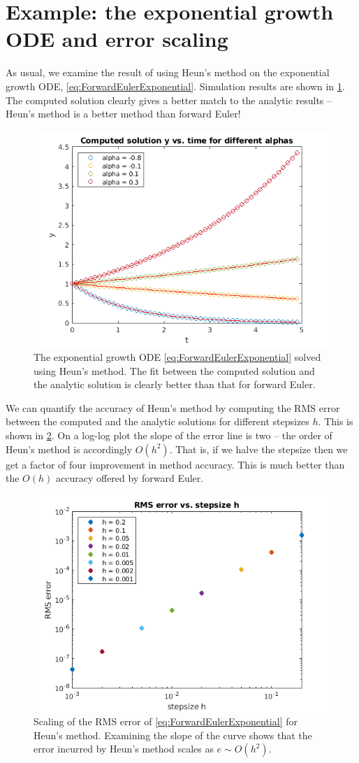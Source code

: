 \documentclass[hidelinks,notitlepage]{book}
\begin{document}
\section{Example: the exponential growth ODE and error scaling}
As usual, we examine the result of using Heun's method on the exponential growth ODE, \cref{eq:ForwardEulerExponential}.  Simulation results are shown in \cref{fig:HeunsMethodExponential}.  The computed solution clearly gives a better match to the analytic results -- Heun's method is a better method than forward Euler!
\begin{figure}[tbh]
	\centering
	\includegraphics[width=0.7\columnwidth]{HeunsMethodExponential.png}
	\caption{The exponential growth ODE \cref{eq:ForwardEulerExponential} solved using Heun's method.  The fit between the computed solution and the analytic solution is clearly better than that for forward Euler.}
	\label{fig:HeunsMethodExponential}
\end{figure}
We can quantify the accuracy of Heun's method by computing the RMS error between the computed and the analytic solutions for different stepsizes $h$.  This is shown in \cref{fig:HeunsMethodExponentialErr}.  On a log-log plot the slope of the error line is two -- the order of Heun's method is accordingly $O(h^2)$.  That is, if we halve the stepsize then we get a factor of four improvement in method accuracy.  This is much better than the $O(h)$ accuracy offered by forward Euler.
\begin{figure}[tbh]
	\centering
	\includegraphics[width=0.7\columnwidth]{HeunsMethodExponentialErr.png}
	\caption{Scaling of the RMS error of \cref{eq:ForwardEulerExponential} for Heun's method.  Examining the slope of the curve shows that the error incurred by Heun's method scales as $e \sim O(h^2)$.}
	\label{fig:HeunsMethodExponentialErr}
\end{figure}
\end{document}
